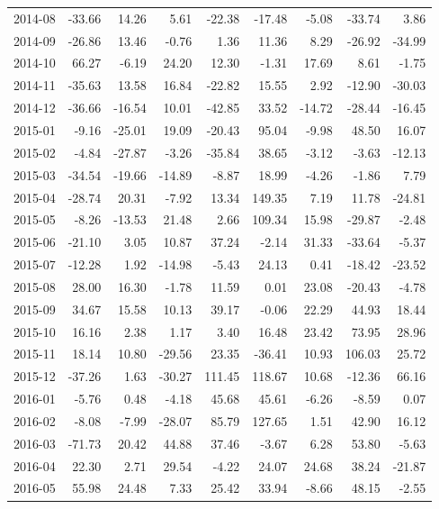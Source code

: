 \begin{table}[ht]
\begin{tabular}{lrrrrrrrr}
  2014-08 & -33.66 & 14.26 & 5.61 & -22.38 & -17.48 & -5.08 & -33.74 & 3.86 \\ 
  2014-09 & -26.86 & 13.46 & -0.76 & 1.36 & 11.36 & 8.29 & -26.92 & -34.99 \\ 
  2014-10 & 66.27 & -6.19 & 24.20 & 12.30 & -1.31 & 17.69 & 8.61 & -1.75 \\ 
  2014-11 & -35.63 & 13.58 & 16.84 & -22.82 & 15.55 & 2.92 & -12.90 & -30.03 \\ 
  2014-12 & -36.66 & -16.54 & 10.01 & -42.85 & 33.52 & -14.72 & -28.44 & -16.45 \\ 
  2015-01 & -9.16 & -25.01 & 19.09 & -20.43 & 95.04 & -9.98 & 48.50 & 16.07 \\ 
  2015-02 & -4.84 & -27.87 & -3.26 & -35.84 & 38.65 & -3.12 & -3.63 & -12.13 \\ 
  2015-03 & -34.54 & -19.66 & -14.89 & -8.87 & 18.99 & -4.26 & -1.86 & 7.79 \\ 
  2015-04 & -28.74 & 20.31 & -7.92 & 13.34 & 149.35 & 7.19 & 11.78 & -24.81 \\ 
  2015-05 & -8.26 & -13.53 & 21.48 & 2.66 & 109.34 & 15.98 & -29.87 & -2.48 \\ 
  2015-06 & -21.10 & 3.05 & 10.87 & 37.24 & -2.14 & 31.33 & -33.64 & -5.37 \\ 
  2015-07 & -12.28 & 1.92 & -14.98 & -5.43 & 24.13 & 0.41 & -18.42 & -23.52 \\ 
  2015-08 & 28.00 & 16.30 & -1.78 & 11.59 & 0.01 & 23.08 & -20.43 & -4.78 \\ 
  2015-09 & 34.67 & 15.58 & 10.13 & 39.17 & -0.06 & 22.29 & 44.93 & 18.44 \\ 
  2015-10 & 16.16 & 2.38 & 1.17 & 3.40 & 16.48 & 23.42 & 73.95 & 28.96 \\ 
  2015-11 & 18.14 & 10.80 & -29.56 & 23.35 & -36.41 & 10.93 & 106.03 & 25.72 \\ 
  2015-12 & -37.26 & 1.63 & -30.27 & 111.45 & 118.67 & 10.68 & -12.36 & 66.16 \\ 
  2016-01 & -5.76 & 0.48 & -4.18 & 45.68 & 45.61 & -6.26 & -8.59 & 0.07 \\ 
  2016-02 & -8.08 & -7.99 & -28.07 & 85.79 & 127.65 & 1.51 & 42.90 & 16.12 \\ 
  2016-03 & -71.73 & 20.42 & 44.88 & 37.46 & -3.67 & 6.28 & 53.80 & -5.63 \\ 
  2016-04 & 22.30 & 2.71 & 29.54 & -4.22 & 24.07 & 24.68 & 38.24 & -21.87 \\ 
  2016-05 & 55.98 & 24.48 & 7.33 & 25.42 & 33.94 & -8.66 & 48.15 & -2.55 \\ 

\end{tabular}
\end{table}
